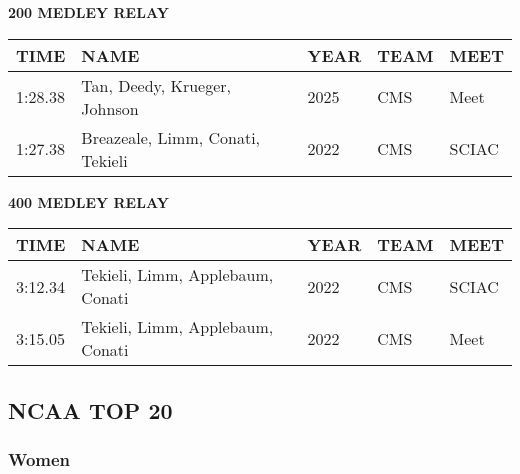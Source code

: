 \vspace{0.4cm}

\begin{center}
\begin{minipage}[t]{0.7\textwidth}
\centering
\textbf{200 MEDLEY RELAY}\\[0.05cm]
\begin{tabular}{@{}p{1.8cm}p{2.8cm}p{1.2cm}p{1.4cm}p{1.4cm}@{}}
\hline
\textbf{TIME} & \textbf{NAME} & \textbf{YEAR} & \textbf{TEAM} & \textbf{MEET} \\
\hline
1:28.38 & Tan, Deedy, Krueger, Johnson & 2025 & CMS & Meet \\
1:27.38 & Breazeale, Limm, Conati, Tekieli & 2022 & CMS & SCIAC \\
\hline
\end{tabular}
\end{minipage}
\end{center}

\vspace{0.4cm}

\begin{center}
\begin{minipage}[t]{0.7\textwidth}
\centering
\textbf{400 MEDLEY RELAY}\\[0.05cm]
\begin{tabular}{@{}p{1.8cm}p{2.8cm}p{1.2cm}p{1.4cm}p{1.4cm}@{}}
\hline
\textbf{TIME} & \textbf{NAME} & \textbf{YEAR} & \textbf{TEAM} & \textbf{MEET} \\
\hline
3:12.34 & Tekieli, Limm, Applebaum, Conati & 2022 & CMS & SCIAC \\
3:15.05 & Tekieli, Limm, Applebaum, Conati & 2022 & CMS & Meet \\
\hline
\end{tabular}
\end{minipage}
\end{center}

\vspace{0.4cm}

\newpage

\subsection{NCAA TOP 20}
\subsubsection{Women}

